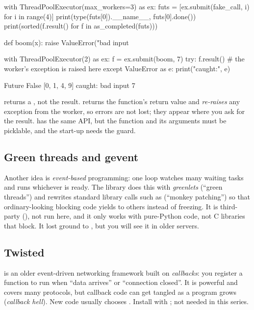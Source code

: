 \begin{pycode}
with ThreadPoolExecutor(max_workers=3) as ex:
    futs = [ex.submit(fake_call, i) for i in range(4)]
    print(type(futs[0]).__name__, futs[0].done())
    print(sorted(f.result() for f in as_completed(futs)))

def boom(x):
    raise ValueError("bad input %

with ThreadPoolExecutor(2) as ex:
    f = ex.submit(boom, 7)
    try:
        f.result()                # the worker's exception is raised here
    except ValueError as e:
        print("caught:", e)
\end{pycode}
\begin{rawcode}
Future False
[0, 1, 4, 9]
caught: bad input 7
\end{rawcode}

\begin{typecheck}
 returns a , not the result.  returns the
function's return value and \emph{re-raises} any exception from the worker, so errors are not
lost; they appear where you ask for the result.  has the same API, but
the function and its arguments must be picklable, and the start-up needs the 
guard.
\end{typecheck}

\subsection{Green threads and gevent}

Another idea is \emph{event-based} programming: one loop watches many waiting tasks and runs
whichever is ready. The  library does this with \emph{greenlets} (``green threads'')
and rewrites standard library calls such as  (``monkey patching'') so that ordinary-looking
blocking code yields to others instead of freezing. It is third-party (),
not run here, and it only works with pure-Python code, not C libraries that block. It lost ground
to , but you will see it in older servers.

\subsection{Twisted}

 is an older event-driven networking framework built on \emph{callbacks}: you
register a function to run when ``data arrives'' or ``connection closed''. It is powerful and
covers many protocols, but callback code can get tangled as a program grows (\emph{callback
hell}). New code usually chooses . Install with ; not
needed in this series.

